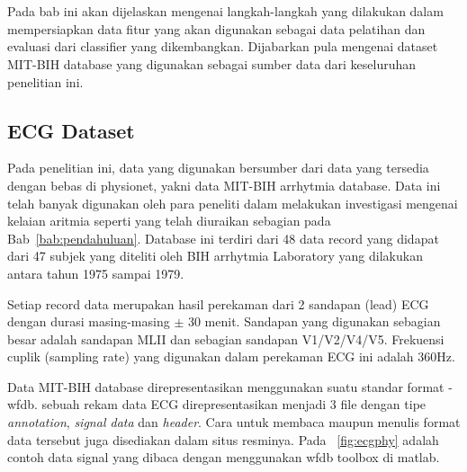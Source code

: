 \chapter{\babTiga}
Pada bab ini akan dijelaskan mengenai langkah-langkah yang dilakukan dalam
mempersiapkan data fitur yang akan digunakan sebagai data pelatihan dan evaluasi
dari classifier yang dikembangkan. Dijabarkan pula mengenai dataset MIT-BIH
database yang digunakan sebagai sumber data dari keseluruhan penelitian ini.

\section{ECG Dataset}
Pada penelitian ini, data yang digunakan bersumber dari data yang tersedia
dengan bebas di physionet, yakni data MIT-BIH arrhytmia database. Data ini telah
banyak digunakan oleh para peneliti dalam melakukan investigasi mengenai kelaian
aritmia seperti yang telah diuraikan sebagian pada Bab~\ref{bab:pendahuluan}. Database
ini terdiri dari 48 data record yang didapat dari 47 subjek yang diteliti oleh
BIH arrhytmia Laboratory yang dilakukan antara tahun 1975 sampai 1979. 


Setiap record data merupakan hasil perekaman dari 2 sandapan (lead) ECG dengan
durasi masing-masing $\pm$ 30 menit. Sandapan yang digunakan sebagian besar
adalah sandapan MLII dan sebagian sandapan V1/V2/V4/V5. Frekuensi cuplik
(sampling rate) yang digunakan dalam perekaman ECG ini adalah 360Hz.

Data MIT-BIH database direpresentasikan menggunakan suatu standar
format - \gls{wfdb}. sebuah rekam data ECG direpresentasikan menjadi 3 file
dengan tipe \textit{annotation}, \textit{signal data} dan \textit{header}. Cara untuk
membaca maupun menulis format data tersebut juga disediakan dalam situs
resminya. Pada \pic~\ref{fig:ecgphy} adalah contoh data signal yang dibaca
dengan menggunakan \gls{wfdb} toolbox di matlab.
 

